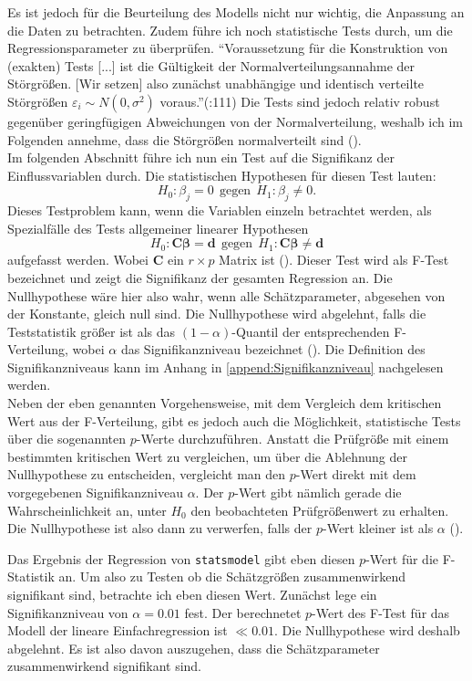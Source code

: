 Es ist jedoch für die Beurteilung des Modells nicht nur wichtig, die Anpassung an die Daten zu betrachten. Zudem führe ich noch statistische Tests durch, um die Regressionsparameter zu überprüfen. "`Voraussetzung für die Konstruktion von (exakten) Tests [...] ist die Gültigkeit der Normalverteilungsannahme der Störgrößen. [Wir setzen] also zunächst unabhängige und identisch verteilte Störgrößen $\varepsilon_i \sim N(0,\sigma^2)$ voraus."'(\cite{Fahrmeir.2009}:111) Die Tests sind jedoch relativ robust gegenüber geringfügigen Abweichungen von der Normalverteilung, weshalb ich im Folgenden annehme, dass die Störgrößen normalverteilt sind (\cite{Fahrmeir.2009}).\\
Im folgenden Abschnitt führe ich nun ein Test auf die Signifikanz der Einflussvariablen durch. Die statistischen Hypothesen für diesen Test lauten:
$$ H_0 : \beta_j = 0 \ \ \text{gegen} \ \ H_1: \beta_j \neq 0. $$
Dieses Testproblem kann, wenn die Variablen einzeln betrachtet werden, als Spezialfälle des Tests allgemeiner linearer Hypothesen
$$H_0: \boldsymbol{C}\boldsymbol{\beta} = \boldsymbol{d} \ \ \text{gegen} \ \ H_1: \boldsymbol{C}\boldsymbol{\beta} \neq \boldsymbol{d}$$
aufgefasst werden. Wobei $\boldsymbol{C}$ ein $r \times p$ Matrix ist (\cite{Fahrmeir.2009}). Dieser Test wird als F-Test bezeichnet und zeigt die Signifikanz der gesamten Regression an. Die Nullhypothese wäre hier also wahr, wenn alle Schätzparameter, abgesehen von der Konstante, gleich null sind. Die Nullhypothese wird abgelehnt, falls die Teststatistik größer ist als das $(1-\alpha)$-Quantil der entsprechenden F-Verteilung, wobei $\alpha$ das Signifikanzniveau bezeichnet (\cite{Fahrmeir.2009}). Die Definition des Signifikanzniveaus kann im Anhang in \ref{append:Signifikanzniveau} nachgelesen werden. \\
Neben der eben genannten Vorgehensweise, mit dem Vergleich dem kritischen Wert aus der F-Verteilung, gibt es jedoch auch die Möglichkeit, statistische Tests über die sogenannten $p$-Werte durchzuführen. Anstatt die Prüfgröße mit einem bestimmten kritischen Wert zu vergleichen, um über die Ablehnung der Nullhypothese zu entscheiden, vergleicht man den $p$-Wert direkt mit dem vorgegebenen Signifikanzniveau $\alpha$. Der $p$-Wert gibt nämlich gerade die Wahrscheinlichkeit an, unter $H_0$ den beobachteten Prüfgrößenwert zu erhalten. Die Nullhypothese ist also dann zu verwerfen, falls der $p$-Wert kleiner ist als $\alpha$ (\cite{Fahrmeir.2011}).

Das Ergebnis der Regression von \texttt{statsmodel} gibt eben diesen $p$-Wert für die F-Statistik an. Um also zu Testen ob die Schätzgrößen zusammenwirkend signifikant sind, betrachte ich eben diesen Wert. Zunächst lege ein Signifikanzniveau von $\alpha = 0.01$ fest. Der berechnetet $p$-Wert des F-Test für das Modell der lineare Einfachregression ist $ \ll 0.01$. Die Nullhypothese wird deshalb abgelehnt. Es ist also davon auszugehen, dass die Schätzparameter zusammenwirkend signifikant sind.

